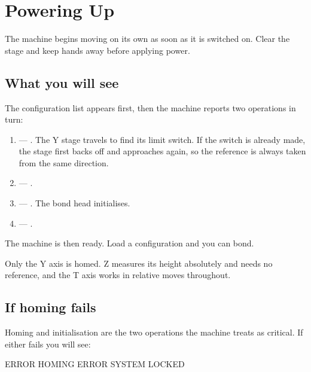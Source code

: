 \chapter{Powering Up}
\label{ch:powerup}

\begin{wbwarning}
The machine begins moving on its own as soon as it is switched on. Clear the
stage and keep hands away before applying power.
\end{wbwarning}

\section{What you will see}

The configuration list appears first, then the machine reports two operations
in turn:

\begin{enumerate}[leftmargin=*]
\item {} --- . The Y stage travels to find its limit
  switch. If the switch is already made, the stage first backs off and
  approaches again, so the reference is always taken from the same direction.
\item {} --- .
\item {} --- . The bond head initialises.
\item {} --- .
\end{enumerate}

The machine is then ready. Load a configuration and you can bond.

\begin{wbnote}
Only the Y axis is homed. Z measures its height absolutely and needs no
reference, and the T axis works in relative moves throughout.
\end{wbnote}

\section{If homing fails}

Homing and initialisation are the two operations the machine treats as
critical. If either fails you will see:

\begin{lcdscreen}
\begin{lcdverb}
ERROR
HOMING
ERROR SYSTEM LOCKED
\end{lcdverb}
\end{lcdscreen}

